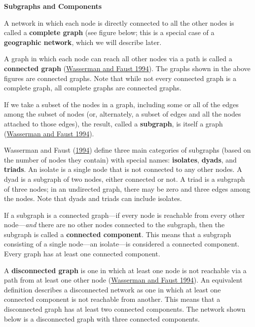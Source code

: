 \documentclass{book}
\begin{document}
\textbf{Subgraphs and Components}

A network in which each node is directly connected to all the other nodes is
called a \textbf{complete graph} (see figure below; this is a special case of
a \textbf{geographic network}, which we will describe later.

A graph in which each node can reach all other nodes via a path is called a
\textbf{connected graph} (\protect\hyperlink{ref-WassermanFaust1994}{Wasserman
and Faust 1994}). The graphs shown in the above figures are connected graphs.
Note that while not every connected graph is a complete graph, all complete
graphs are connected graphs.

If we take a subset of the nodes in a graph, including some or all of the
edges among the subset of nodes (or, alternately, a subset of edges and all
the nodes attached to those edges), the result, called a \textbf{subgraph}, is
itself a graph (\protect\hyperlink{ref-WassermanFaust1994}{Wasserman and Faust
1994}).

Wasserman and Faust (\protect\hyperlink{ref-WassermanFaust1994}{1994}) define
three main categories of subgraphs (based on the number of nodes they contain)
with special names: \textbf{isolates}, \textbf{dyads}, and \textbf{triads}. An
isolate is a single node that is not connected to any other nodes. A dyad is a
subgraph of two nodes, either connected or not. A triad is a subgraph of three
nodes; in an undirected graph, there may be zero and three edges among the
nodes. Note that dyads and triads can include isolates.

If a subgraph is a connected graph---if every node is reachable from every
other node---\emph{and} there are no other nodes connected to the subgraph,
then the subgraph is called a \textbf{connected component}. This means that a
subgraph consisting of a single node---an isolate---is considered a connected
component. Every graph has at least one connected component.

A \textbf{disconnected graph} is one in which at least one node is not
reachable via a path from at least one other node
(\protect\hyperlink{ref-WassermanFaust1994}{Wasserman and Faust 1994}). An
equivalent definition describes a disconnected network as one in which at
least one connected component is not reachable from another. This means that a
disconnected graph has at least two connected components. The network shown
below is a disconnected graph with three connected components.
\end{document}

